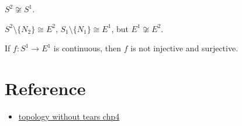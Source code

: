 \begin{proposition}{}{}
    $S^2\not\cong S^1$.
\end{proposition}
    $S^2\setminus \{N_2\}\cong E^2$, $S_1\setminus \{N_1\}\cong E^1$, but $E^1\not\cong E^2$.

\begin{proposition}
    If $f:S^1\rightarrow E^1$ is continuous, then $f$ is not injective and surjective.
\end{proposition}


\begin{proposition}{}{}
    
\end{proposition}

\section{Reference}

\begin{itemize}
    \item \href{}{topology without tears chp4}
\end{itemize}